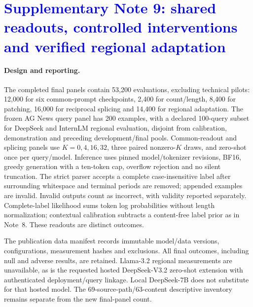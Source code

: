 \section*{\textcolor{blue}{Supplementary Note 9: shared readouts, controlled interventions and verified regional adaptation}}
\label{snote:followup}
\begingroup\color{blue}

\paragraph{Design and reporting.} The completed final panels contain 53,200 evaluations, excluding technical pilots: 12,000 for six common-prompt checkpoints, 2,400 for count/length, 8,400 for patching, 16,000 for reciprocal splicing and 14,400 for regional adaptation. The frozen AG News query panel has 200 examples, with a declared 100-query subset for DeepSeek and InternLM regional evaluation, disjoint from calibration, demonstration and preceding development/final pools. Common-readout and splicing panels use $K=0,4,16,32$, three paired nonzero-$K$ draws, and zero-shot once per query/model. Inference uses pinned model/tokenizer revisions, BF16, greedy generation with a ten-token cap, overflow rejection and no silent truncation. The strict parser accepts a complete case-insensitive label after surrounding whitespace and terminal periods are removed; appended examples are invalid. Invalid outputs count as incorrect, with validity reported separately. Complete-label likelihood sums token log probabilities without length normalization; contextual calibration subtracts a content-free label prior as in Note~8. These readouts are distinct outcomes.

The publication data manifest records immutable model/data versions, configurations, measurement hashes and exclusions. All final outcomes, including null and adverse results, are retained. Llama-3.2 regional measurements are unavailable, as is the requested hosted DeepSeek-V3.2 zero-shot extension with authenticated deployment/query linkage. Local DeepSeek-7B does not substitute for that hosted model. The 69-source-path/63-content descriptive inventory remains separate from the new final-panel count.

